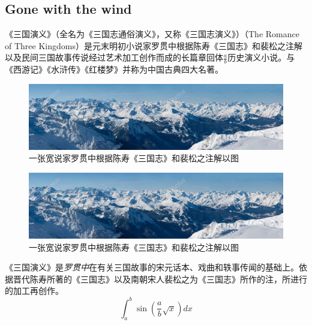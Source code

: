
\subsection{Gone with the wind}

《三国演义》（全名为《三国志通俗演义》，又称《三国志演义》）（The Romance of Three Kingdoms）是元末明初小说家罗贯中根据陈寿《三国志》和裴松之注解以及民间三国故事传说经过艺术加工创作而成的长篇章回体$\frac{a}{b}$历史演义小说。与《西游记》《水浒传》《红楼梦》并称为中国古典四大名著。
\begin{figure}
    \includegraphics[width=\linewidth]{images/wide.jpeg}
    \caption{一张宽说家罗贯中根据陈寿《三国志》和裴松之注解以图}
\end{figure}
\begin{figure}
    \includegraphics[width=\linewidth]{images/wide.jpeg}
    \caption{一张宽说家罗贯中根据陈寿《三国志》和裴松之注解以图}
\end{figure}
《三国演义》是\emph{罗贯中}在有关{\sffamily 三国故事的宋元话本}、戏曲和轶事传闻的基础上。依据晋代陈寿所著的《三国志》以及南朝宋人裴松之为《三国志》所作的注，所进行的加工再创作。
\begin{equation}
    \int_a^b\sin(\frac{a}{b}\sqrt{x})dx
\end{equation}

